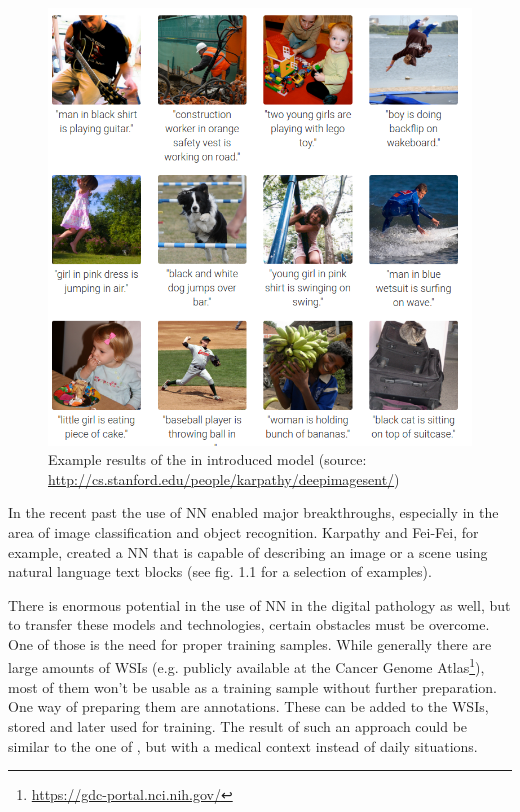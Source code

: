 \begin{figure}[ht]
	\begin{center}
		\includegraphics[scale=0.3]{img/deepVisual.png}
		\caption{Example results of the in \cite{Karpathy15} introduced model (source: \url{http://cs.stanford.edu/people/karpathy/deepimagesent/})}
		\label{fig:fig1.1}
	\end{center}
\end{figure}

In the recent past the use of NN enabled major breakthroughs, especially in the area of image classification and object recognition. Karpathy and Fei-Fei, for example, created a NN that is capable of describing an image or a scene using natural language text blocks \cite{Karpathy15} (see fig. 1.1 for a selection of examples).

There is enormous potential in the use of NN in the digital pathology as well, but to transfer these models and technologies, certain obstacles must be overcome. One of those is the need for proper training samples. While generally there are large amounts of WSIs (e.g. publicly available at the Cancer Genome Atlas\footnote{\url{https://gdc-portal.nci.nih.gov/}}), most of them won't be usable as a training sample without further preparation. One way of preparing them are annotations.  These can be added to the WSIs, stored and later used for training. The result of such an approach could be similar to the one of \cite{Karpathy15}, but with a medical context instead of daily situations.


